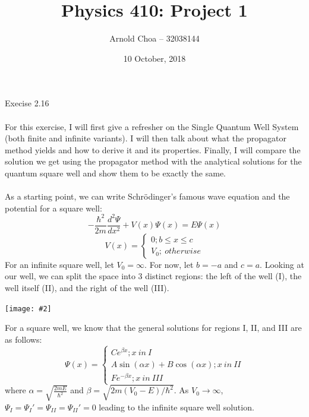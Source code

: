 \documentclass[10pt]{article} %
\title{Physics 410: Project 1}
\author{Arnold Choa -- 32038144}
\date{10 October, 2018} %
\newcommand{\centerfig}[2]{\begin{center}\texttt{[image: \#2]}\end{center}}
\begin{document}
\maketitle
\vspace{-0.5cm}
\noindent \Large{Execise 2.16}
\\ \\
\normalsize{For this exercise, I will first give a refresher on the Single Quantum Well System (both finite and infinite variants). I will then talk about what the propagator method yields and how to derive it and its properties. Finally, I will compare the solution we get using the propagator method with the analytical solutions for the quantum square well and show them to be exactly the same.}
\\ \\
\noindent As a starting point, we can write Schr{\"o}dinger's famous wave equation and the potential for a square well:
\begin{equation}
-\frac{\hbar ^{2}}{2m}\frac{d^2 \Psi}{dx^2} + V(x)\Psi (x) = E \Psi (x)
\end{equation}
\begin{equation}
V(x) = 
\begin{cases}
	0 ; b\leq x \leq c \\
	V_{0};\ otherwise
\end{cases}
\end{equation}
\noindent For an infinite square well, let $V_{0} = \infty$. For now, let $b = -a$ and $c = a$. Looking at our well, we can split the space into 3 distinct regions: the left of the well (I), the well itself (II), and the right of the well (III).
\centerfig{.3}{../figs/single_well.png}
For a square well, we know that the general solutions for regions I, II, and III are as follows:
\begin{equation}
\Psi (x) = 
\begin{cases}
	Ce^{\beta x}; x\ in\ I\\
	A\sin (\alpha x) + B\cos (\alpha x); x\ in\ II\\
	Fe^{ - \beta x}; x\ in\ III
\end{cases}
\end{equation}
where $\alpha = \sqrt{\frac{2mE}{\hbar ^{2}}}$ and $\beta = \sqrt{2m(V_{0} - E) / \hbar ^2}$. As $V_{0} \rightarrow \infty$, $\Psi_I = \Psi_I' = \Psi_{II} = \Psi_{II}' = 0$ leading  to the infinite square well solution.
\end{document}
